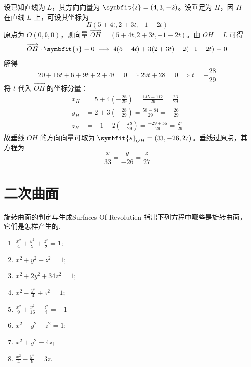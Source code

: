 \begin{solution}
    设已知直线为 $L$，其方向向量为 $\symbfit{s} = (4, 3, -2)$。设垂足为 $H$，因 $H$ 在直线 $L$ 上，可设其坐标为
    \begin{equation*}
        H(5 + 4t, 2 + 3t, -1 - 2t)
    \end{equation*}
    原点为 $O(0, 0, 0)$，则向量 $\overrightarrow{OH} = (5 + 4t, 2 + 3t, -1 - 2t)$。由 $OH \perp L$ 可得
    \begin{equation*}
        \overrightarrow{OH} \cdot \symbfit{s} = 0 \implies 4(5 + 4t) + 3(2 + 3t) - 2(-1 - 2t) = 0
    \end{equation*}
    解得
    \begin{equation*}
        20 + 16t + 6 + 9t + 2 + 4t = 0 \implies 29t + 28 = 0 \implies t = -\frac{28}{29}
    \end{equation*}
    将 $t$ 代入 $\overrightarrow{OH}$ 的坐标分量：
    \begin{equation*}
        \begin{aligned}
            x_H & = 5 + 4\left(-\frac{28}{29}\right) = \frac{145 - 112}{29} = \frac{33}{29} \\
            y_H & = 2 + 3\left(-\frac{28}{29}\right) = \frac{58 - 84}{29} = -\frac{26}{29}  \\
            z_H & = -1 - 2\left(-\frac{28}{29}\right) = \frac{-29 + 56}{29} = \frac{27}{29}
        \end{aligned}
    \end{equation*}
    故垂线 $OH$ 的方向向量可取为 $\symbfit{s}_{OH} = (33, -26, 27)$。垂线过原点，其方程为
    \begin{equation*}
        \boxed{\frac{x}{33} = \frac{y}{-26} = \frac{z}{27}}
    \end{equation*}
\end{solution}

\section{二次曲面}

\begin{problem}{旋转曲面的判定与生成}{Surfaces-Of-Revolution}
    指出下列方程中哪些是旋转曲面，它们是怎样产生的.
    \begin{enumerate}
        \item $\frac{x^{2}}{4}+\frac{y^{2}}{9}+\frac{z^{2}}{9}=1$;
        \item $x^{2}+y^{2}+z^{2}=1$;
        \item $x^{2}+2 y^{2}+34 z^{2}=1$;
        \item $x^{2}-\frac{y^{2}}{4}+z^{2}=1$;
        \item $\frac{x^{2}}{9}+\frac{y^{2}}{16}-\frac{z^{2}}{9}=-1$;
        \item $x^{2}-y^{2}-z^{2}=1$;
        \item $x^{2}+y^{2}=4 z$;
        \item $\frac{x^{2}}{4}-\frac{y^{2}}{9}=3 z$.
    \end{enumerate}
\end{problem}


